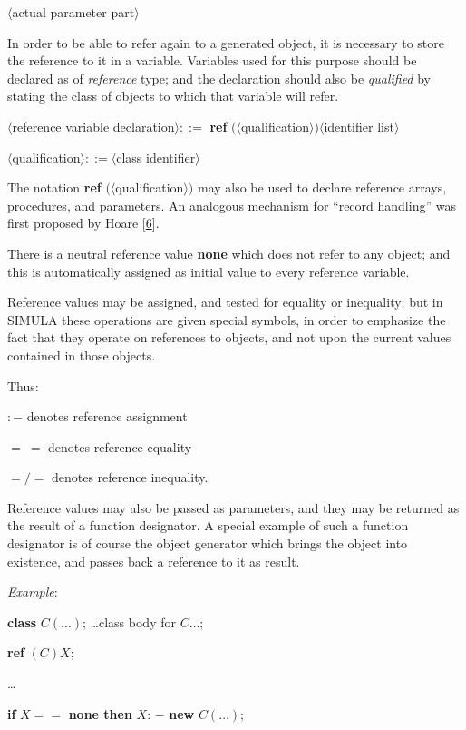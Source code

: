 \tabto*{11.6em}$\langle$actual parameter part$\rangle$

In order to be able to refer again to a generated object, it is necessary to store the reference to it in a variable. Variables used for this purpose should be declared as of \textit{reference} type; and the declaration should also be \textit{qualified} by stating the class of objects to which that variable will refer.

\quad $\langle$reference variable declaration$\rangle ::=$ \textbf{ref} $(\langle $qualification$\rangle) \langle$identifier list$\rangle$

\quad $\langle$qualification$\rangle ::= \langle$class identifier$\rangle$

\noindent
The notation \textbf{ref} $(\langle$qualification$\rangle)$ may also be used to declare reference arrays, procedures, and parameters. An analogous mechanism for ``record handling'' was first proposed by Hoare [\hyperref[ref:6]{6}].

There is a neutral reference value \textbf{none} which does not refer to any object; and this is automatically assigned as initial value to every reference variable.

Reference values may be assigned, and tested for equality or inequality; but in SIMULA these operations are given special symbols, in order to emphasize the fact that they operate on references to objects, and not upon the current values contained in those objects.

\noindent
Thus:

\quad $:-$\tabto*{5.6em} denotes reference assignment

\quad $=\ =$\tabto*{5.6em} denotes reference equality

\quad $=/=$\tabto*{5.6em} denotes reference inequality.

\noindent
Reference values may also be passed as parameters, and they may be returned as the result of a function designator. A special example of such a function designator is of course the object generator which brings the object into existence, and passes back a reference to it as result.

\noindent
\textit{Example}:

\quad \textbf{class} $C(\dots)$; \dots class body for $C\dots$;

\quad \textbf{ref} $(C)X$;

\qquad \dots

\qquad \textbf{if} $X ==$ \textbf{none then} $X$: $-$ \textbf{new} $C(\dots)$;

